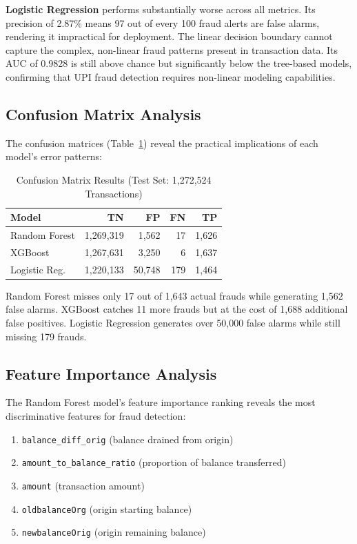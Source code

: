 \documentclass[conference]{IEEEtran}
\begin{document}
\textbf{Logistic Regression} performs substantially worse across all metrics. Its precision of 2.87\% means 97 out of every 100 fraud alerts are false alarms, rendering it impractical for deployment. The linear decision boundary cannot capture the complex, non-linear fraud patterns present in transaction data. Its AUC of 0.9828 is still above chance but significantly below the tree-based models, confirming that UPI fraud detection requires non-linear modeling capabilities.

\subsection{Confusion Matrix Analysis}
The confusion matrices (Table~\ref{tab:confusion}) reveal the practical implications of each model's error patterns:

\begin{table}[h]
\caption{Confusion Matrix Results (Test Set: 1,272,524 Transactions)}
\label{tab:confusion}
\centering
\small
\begin{tabular}{|l|r|r|r|r|}
\hline
\textbf{Model} & \textbf{TN} & \textbf{FP} & \textbf{FN} & \textbf{TP} \\
\hline
Random Forest & 1,269,319 & 1,562 & 17 & 1,626 \\
\hline
XGBoost & 1,267,631 & 3,250 & 6 & 1,637 \\
\hline
Logistic Reg. & 1,220,133 & 50,748 & 179 & 1,464 \\
\hline
\end{tabular}
\end{table}

Random Forest misses only 17 out of 1,643 actual frauds while generating 1,562 false alarms. XGBoost catches 11 more frauds but at the cost of 1,688 additional false positives. Logistic Regression generates over 50,000 false alarms while still missing 179 frauds.

\subsection{Feature Importance Analysis}
The Random Forest model's feature importance ranking reveals the most discriminative features for fraud detection:
\begin{enumerate}
    \item \texttt{balance\_diff\_orig} (balance drained from origin)
    \item \texttt{amount\_to\_balance\_ratio} (proportion of balance transferred)
    \item \texttt{amount} (transaction amount)
    \item \texttt{oldbalanceOrg} (origin starting balance)
    \item \texttt{newbalanceOrig} (origin remaining balance)
\end{enumerate}
\end{document}
